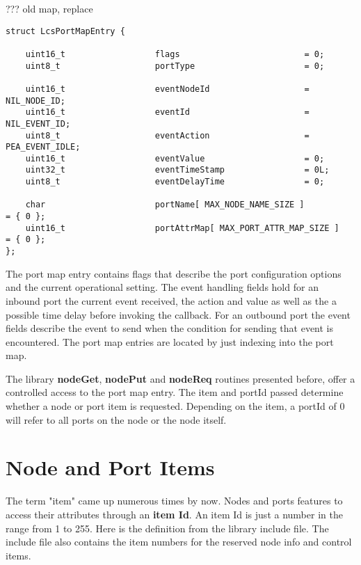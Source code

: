 ??? old map, replace 

\lstset{style=listingstyle}
\begin{lstlisting}
struct LcsPortMapEntry {

    uint16_t                  flags                         = 0;
    uint8_t                   portType                      = 0;

    uint16_t                  eventNodeId                   = NIL_NODE_ID;
    uint16_t                  eventId                       = NIL_EVENT_ID;
    uint8_t                   eventAction                   = PEA_EVENT_IDLE;
    uint16_t                  eventValue                    = 0;
    uint32_t                  eventTimeStamp                = 0L;
    uint8_t                   eventDelayTime                = 0;

    char                      portName[ MAX_NODE_NAME_SIZE ]          = { 0 };
    uint16_t                  portAttrMap[ MAX_PORT_ATTR_MAP_SIZE ]   = { 0 };
};
\end{lstlisting}

The port map entry contains flags that describe the port configuration options and the current operational setting. The event handling fields hold for an inbound port the current event received, the action and value as well as the a possible time delay before invoking the callback. For an outbound port the event fields describe the event to send when the condition for sending that event is encountered. The port map entries are located by just indexing into the port map.

The library \textbf{nodeGet}, \textbf{nodePut} and \textbf{nodeReq} routines presented before, offer a controlled access to the port map entry. The item and portId passed determine whether a node or port item is requested. Depending on the item, a portId of 0 will refer to all ports on the node or the node itself.

\section{Node and Port Items}

The term "item" came up numerous times by now. Nodes and ports features to access their attributes through an \textbf{item Id}. An item Id is just a number in the range from 1 to 255. Here is the definition from the library include file. The include file also contains the item numbers for the reserved node info and control items.

